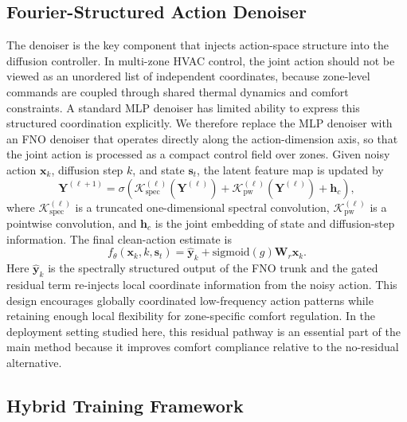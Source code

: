 ﻿\documentclass[conference]{IEEEtran}
\theoremstyle{nonumberplain}
\theoremstyle{plain}
\begin{document}
\subsection{Fourier-Structured Action Denoiser}

The denoiser is the key component that injects action-space structure into the diffusion controller. In multi-zone HVAC control, the joint action should not be viewed as an unordered list of independent coordinates, because zone-level commands are coupled through shared thermal dynamics and comfort constraints. A standard MLP denoiser has limited ability to express this structured coordination explicitly. We therefore replace the MLP denoiser with an FNO denoiser that operates directly along the action-dimension axis, so that the joint action is processed as a compact control field over zones. Given noisy action $\mathbf{x}_k$, diffusion step $k$, and state $\mathbf{s}_t$, the latent feature map is updated by
\begin{equation}
    \mathbf{Y}^{(\ell+1)} =
    \sigma\!\left(
    \mathcal{K}_{\mathrm{spec}}^{(\ell)}(\mathbf{Y}^{(\ell)}) +
    \mathcal{K}_{\mathrm{pw}}^{(\ell)}(\mathbf{Y}^{(\ell)}) +
    \mathbf{h}_c
    \right),
    \label{eq:spectral_layer}
\end{equation}
where $\mathcal{K}_{\mathrm{spec}}^{(\ell)}$ is a truncated one-dimensional spectral convolution, $\mathcal{K}_{\mathrm{pw}}^{(\ell)}$ is a pointwise convolution, and $\mathbf{h}_c$ is the joint embedding of state and diffusion-step information. The final clean-action estimate is
\begin{equation}
    f_{\theta}(\mathbf{x}_k,k,\mathbf{s}_t)=
    \hat{\mathbf{y}}_k + \mathrm{sigmoid}(g)\mathbf{W}_r\mathbf{x}_k.
    \label{eq:final_denoiser}
\end{equation}
Here $\hat{\mathbf{y}}_k$ is the spectrally structured output of the FNO trunk and the gated residual term re-injects local coordinate information from the noisy action. This design encourages globally coordinated low-frequency action patterns while retaining enough local flexibility for zone-specific comfort regulation. In the deployment setting studied here, this residual pathway is an essential part of the main method because it improves comfort compliance relative to the no-residual alternative.

\subsection{Hybrid Training Framework}
\end{document}
